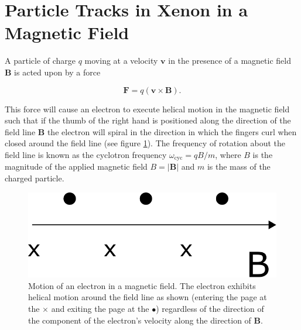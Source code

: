 \documentclass{JINST}
\begin{document}

\section{Particle Tracks in Xenon in a Magnetic Field}\label{sec:magmotion}
A particle of charge $q$ moving at a velocity $\mathbf{v}$ in the presence of a magnetic field $\mathbf{B}$ is acted 
upon by a force

\begin{equation}
\mathbf{F} = q(\mathbf{v} \times \mathbf{B}).
\end{equation}

This force will cause an electron to execute helical motion in the magnetic field such that if the thumb of the right hand is positioned along the direction of the field line $\mathbf{B}$ the electron will spiral in the direction in which the fingers curl when closed around the field line (see figure \ref{fig_bfieldmotion}).  The frequency of rotation about the field line is known as the cyclotron frequency $\omega_{\mathrm{cyc}} = qB/m$, where $B$ is the magnitude of the applied magnetic field $B = |\mathbf{B}|$ and $m$ is the mass of the charged particle.

\begin{figure}[!htb]
	\centering
	\includegraphics[scale=0.48]{fig/bfield_motion.pdf}
	\caption{\label{fig_bfieldmotion}Motion of an electron in a magnetic field.  The electron exhibits helical motion around the field line as shown (entering the page at the $\times$ and exiting the page at the $\bullet$) regardless of the direction of the component of the electron's velocity along the direction of $\mathbf{B}$.}
\end{figure}
\end{document}
